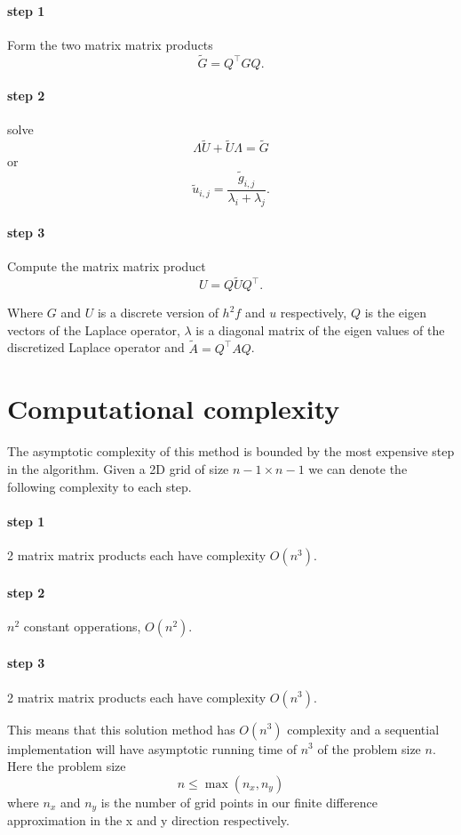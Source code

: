 \documentclass{article}
\begin{document}
\paragraph{step 1}
Form the two matrix matrix products
\[
\tilde{G} = Q^\top G Q.
\]
\paragraph{step 2}
solve
\[
\Lambda \tilde{U} + \tilde{U} \Lambda = \tilde{G}
\]
or
\[
\tilde{u}_{i,j} = \frac{\tilde{g}_{i,j}}{\lambda_i + \lambda_j}.
\]
\paragraph{step 3}
Compute the matrix matrix product
\[
U = Q \tilde{U} Q^\top.
\]

Where $G$ and $U$ is a discrete version of $h^2 f$ and $u$ respectively, $Q$ is the eigen vectors of the Laplace operator,
$\lambda$ is a diagonal matrix of the eigen values of the discretized Laplace operator and $\tilde{A} = Q^\top A Q$.

\section{Computational complexity}
The asymptotic complexity of this method is bounded by the most expensive step
in the algorithm.
Given a 2D grid of size $n-1 \times n-1$ we can denote the following complexity to each step.
\paragraph{step 1}
2 matrix matrix products each have complexity $O(n^3)$.
\paragraph{step 2}
$n^2$ constant opperations, $O(n^2)$.
\paragraph{step 3}
2 matrix matrix products each have complexity $O(n^3)$.

This means that this solution method has $O(n^3)$ complexity and a sequential implementation
will have asymptotic running time of $n^3$ of the problem size $n$. Here the problem size
\[
n \leq \max(n_x,n_y)
\]
where $n_x$ and $n_y$ is the number of grid points in our finite difference approximation
in the x and y direction respectively.
\end{document}

